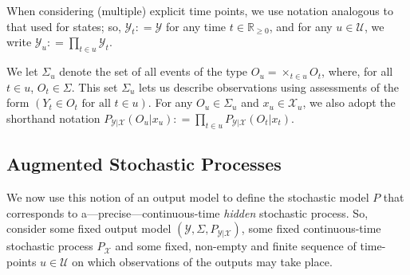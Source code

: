 \documentclass[twoside,11pt]{article}
\newcommand{\reals}{\mathbb{R}}
\newcommand{\realsnonneg}{\reals_{\geq 0}}
\newcommand{\states}{\mathcal{X}}
\newcommand{\observs}{\mathcal{Y}}
\newcommand{\coloneqq}{:\!=}
\begin{document}
When considering (multiple) explicit time points, we use notation analogous to that used for states; so, $\observs_t\coloneqq\observs$ for any time $t\in\realsnonneg$, and for any $u\in\mathcal{U}$, we write $\observs_u\coloneqq \prod_{t\in u}\observs_{t}$. 

We let $\Sigma_u$ denote the set of all events of the type $O_u=\times_{t\in u}O_t$, where, for all $t\in u$, $O_{t}\in\Sigma$. %
This set $\Sigma_u$ lets us describe observations using assessments of the form $(Y_t\in O_t \text{~for all $t\in u$})$. %
For any $O_u\in\Sigma_u$ and $x_u\in\states_u$, we also adopt the shorthand notation $P_{\observs\vert\states}(O_u\vert x_u)\coloneqq \prod_{t\in u}P_{\observs\vert\states}(O_t\vert x_t)$.


\subsection{Augmented Stochastic Processes}\label{sec:aug_stochastic_processes}
We now use this notion of an output model to define the stochastic model $P$ that corresponds to a---precise---continuous-time \emph{hidden} stochastic process. 
So, consider some fixed output model $(\observs,\Sigma,P_{\observs\vert\states})$, some fixed continuous-time stochastic process $P_\states$ and some fixed, non-empty and finite sequence of time-points $u\in\mathcal{U}$ on which observations of the outputs may take place. %
\end{document}
